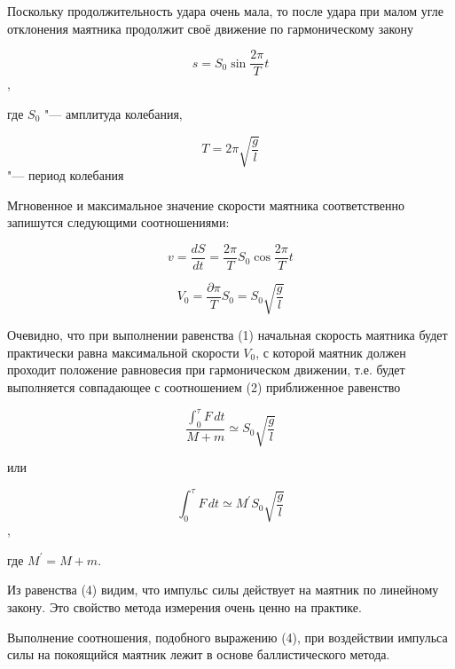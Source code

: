 \begin{enumerate}
    Поскольку продолжительность удара очень мала, то после удара при малом угле отклонения маятника продолжит своё движение по гармоническому закону

    \begin{equation} 
            s=S_0\sin\frac{2\pi}{T}t
    \end{equation},

    где $S_0$ "--- амплитуда колебания,
                    
    \begin{equation} 
            T=2\pi\sqrt{\frac{g}{l}}
    \end{equation} "--- период колебания

    Мгновенное и максимальное значение скорости маятника соответственно запишутся следующими соотношениями:
                    
    \begin{equation} 
            v=\frac{dS}{dt}=\frac{2\pi}{T}S_0\cos\frac{2\pi}{T}t
    \end{equation}
                    

    \begin{equation} 
            V_0=\frac{\partial\pi}{T}S_0=S_0\sqrt{\frac{g}{l}}
    \end{equation}

    Очевидно, что при выполнении равенства (1) начальная скорость маятника будет практически равна максимальной скорости $V_0$,
    с которой маятник должен проходит положение равновесия при гармоническом движении,
    т.е. будет выполняется совпадающее с соотношением (2) приближенное равенство
                    
    \begin{equation} 
            \frac{\int_{0}^{\tau} F \,dt }{M+m}\simeq S_0\sqrt{\frac{g}{l}} 
    \end{equation}
                    
    или
                    
    \begin{equation} 
            \int_{0}^{\tau} F \,dt\simeq M^\prime S_0\sqrt{\frac{g}{l}}
    \end{equation},

    где $M^\prime=M+m$.

    Из равенства (4) видим, что импульс силы действует на маятник по линейному закону.
    Это свойство метода измерения очень ценно на практике.

    Выполнение соотношения, подобного выражению (4),
    при воздействии импульса силы на покоящийся маятник лежит в основе баллистического метода.
\end{enumerate}